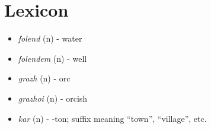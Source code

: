 \documentclass[main.tex]{subfiles}
\newcommand{\lexitem}[3]{\item \textit{#1} (#2) - #3}
\begin{document}
\section{Lexicon}
\begin{itemize}
    \lexitem{folend}{n}{water}
    \lexitem{folendem}{n}{well}
    \lexitem{grazh}{n}{orc}
    \lexitem{grazhoi}{n}{orcish}
    \lexitem{kar}{n}{-ton; suffix meaning ``town'', ``village'', etc.}
\end{itemize}
\end{document}
